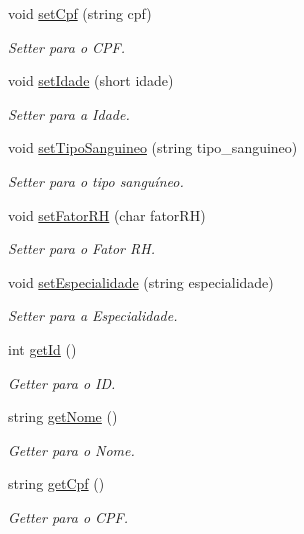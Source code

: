 \begin{DoxyCompactItemize}
void \hyperlink{classFuncionario_a24de20bbd458ab4723f2f7b42732cf79}{set\+Cpf} (string cpf)
\begin{DoxyCompactList}\small\item\em Setter para o C\+PF. \end{DoxyCompactList}\item 
void \hyperlink{classFuncionario_af85eeb2e2b606d60da800c7084f23769}{set\+Idade} (short idade)
\begin{DoxyCompactList}\small\item\em Setter para a Idade. \end{DoxyCompactList}\item 
void \hyperlink{classFuncionario_a979101220d0113b4fc018e1c938d86a2}{set\+Tipo\+Sanguineo} (string tipo\+\_\+sanguineo)
\begin{DoxyCompactList}\small\item\em Setter para o tipo sanguíneo. \end{DoxyCompactList}\item 
void \hyperlink{classFuncionario_acb31e4c590efd268c4c6484f5999df23}{set\+Fator\+RH} (char fator\+RH)
\begin{DoxyCompactList}\small\item\em Setter para o Fator RH. \end{DoxyCompactList}\item 
void \hyperlink{classFuncionario_a799ba2c679c393ca1ee07bb917213f3a}{set\+Especialidade} (string especialidade)
\begin{DoxyCompactList}\small\item\em Setter para a Especialidade. \end{DoxyCompactList}\item 
int \hyperlink{classFuncionario_a0288286a907e587b7ab75d6c23354a06}{get\+Id} ()
\begin{DoxyCompactList}\small\item\em Getter para o ID. \end{DoxyCompactList}\item 
string \hyperlink{classFuncionario_a13f42e2a8cb0515371b49745e5830c4c}{get\+Nome} ()
\begin{DoxyCompactList}\small\item\em Getter para o Nome. \end{DoxyCompactList}\item 
string \hyperlink{classFuncionario_a88db81a06dcaf2115e71be3b1fe8bd1c}{get\+Cpf} ()
\begin{DoxyCompactList}\small\item\em Getter para o C\+PF. \end{DoxyCompactList}\item 

\end{DoxyCompactItemize}
